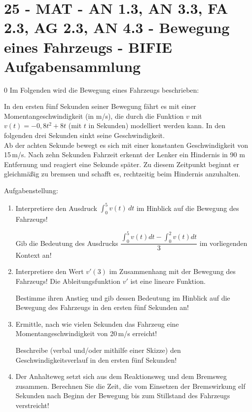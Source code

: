 \section{25 - MAT - AN 1.3, AN 3.3, FA 2.3, AG 2.3, AN 4.3 - Bewegung eines Fahrzeugs - BIFIE Aufgabensammlung}

\begin{langesbeispiel} \item[0] %
				Im Folgenden wird die Bewegung eines Fahrzeugs beschrieben:
				
In den ersten fünf Sekunden seiner Bewegung fährt es mit einer Momentangeschwindigkeit
(in m/s), die durch die Funktion $v$ mit $v(t)=-0,8t^2+8t$ (mit $t$ in Sekunden) modelliert werden
kann. In den folgenden drei Sekunden sinkt seine Geschwindigkeit.\\
Ab der achten Sekunde bewegt es sich mit einer konstanten Geschwindigkeit von 15\,m/s.
Nach zehn Sekunden Fahrzeit erkennt der Lenker ein Hindernis in 90 m Entfernung und reagiert eine Sekunde später. Zu diesem Zeitpunkt beginnt er gleichmäßig zu bremsen und schafft
es, rechtzeitig beim Hindernis anzuhalten.

Aufgabenstellung:
\begin{enumerate}
	\item Interpretiere den Ausdruck $\int^5_0{v(t)}\,dt$ im Hinblick auf die Bewegung des Fahrzeugs!
	
	Gib die Bedeutung des Ausdrucks $\dfrac{\int^5_0{v(t)dt}-\int^2_0{v(t)dt}}{3}$ im vorliegenden Kontext an!
	
	\item Interpretiere den Wert $v'(3)$ im Zusammenhang mit der Bewegung des Fahrzeugs! Die Ableitungsfunktion $v'$ ist eine lineare Funktion.
	
	Bestimme ihren Anstieg und gib dessen Bedeutung im Hinblick auf die Bewegung des Fahrzeugs in den ersten fünf Sekunden an!
	
	\item Ermittle, nach wie vielen Sekunden das Fahrzeug eine Momentangeschwindigkeit von 20\,m/s erreicht!
	
	Beschreibe (verbal und/oder mithilfe einer Skizze) den Geschwindigkeitsverlauf in den ersten fünf Sekunden!
	
	\item Der Anhalteweg setzt sich aus dem Reaktionsweg und dem Bremsweg zusammen. Berechnen Sie die Zeit, die vom Einsetzen der Bremswirkung elf Sekunden nach Beginn der
Bewegung bis zum Stillstand des Fahrzeugs verstreicht!


\end{enumerate}
\end{langesbeispiel}
